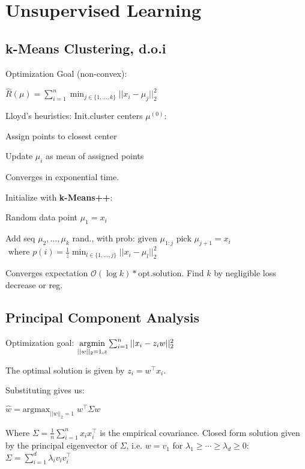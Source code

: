 \section*{Unsupervised Learning}



\subsection*{k-Means Clustering, d.o.i}

Optimization Goal (non-convex):

\qquad $\hat{R} (\mu) = \sum_{i=1}^n \min_{j\in \{1,\ldots,k\}} ||x_i - \mu_j||_2^2$

Lloyd's heuristics:
Init.cluster centers $\mu^{(0)}$:
\begin{compactitem}
	\item Assign points to closest center				
	\item Update $\mu_i$ as mean of assigned points
\end{compactitem}

Converges in exponential time.

Initialize with \textbf{k-Means++}:

\begin{compactitem}
	\item Random data point $\mu_1 = x_i$
	\item Add seq $\mu_2, \ldots ,\mu_k$ rand., with prob:
		$\text{given } \mu_{1:j} \text{ pick } \mu_{j+1} = x_i$ 
		$\text{ where } p(i) = \frac{1}{z} \min_{l \in \{1,\ldots,j\}} ||x_i - \mu_l||_2^2$
\end{compactitem}
Converges expectation $\mathcal O (\log k) * \text{opt.solution}$.
Find $k$ by negligible loss decrease or reg.

\subsection*{Principal Component Analysis}

Optimization goal:
$\underset{||w||_2 = 1, z}{\text{argmin}} \sum_{i=1}^n ||x_i - z_i w||_2^2$

The optimal solution is given by $z_i = w^\top x_i$.  

Substituting gives us:

\qquad \qquad $\hat{w} = \text{argmax}_{||w||_2=1} \; w^\top \Sigma w$

Where $\Sigma = \frac{1}{n} \sum_{i=1}^n x_i x_i^\top$ is the empirical covariance. Closed form solution given by the principal eigenvector of $\Sigma$, i.e. $w = v_1$ for $\lambda_1 \geq \cdots \geq \lambda_d \geq 0$:
$\Sigma = \sum_{i=1}^d \lambda_i v_i v_i^\top$

